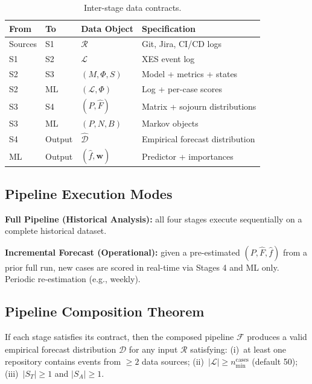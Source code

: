 \begin{table}[htbp]
\centering
\caption{Inter-stage data contracts.}
\label{tab:data-contracts}
\small
\begin{tabular}{lllp{5cm}}
\toprule
\textbf{From} & \textbf{To} & \textbf{Data Object} & \textbf{Specification} \\
\midrule
Sources & S1     & $\mathcal{R}$        & Git, Jira, CI/CD logs \\
S1      & S2     & $\mathcal{L}$        & XES event log \\
S2      & S3     & $(M, \Phi, S)$       & Model + metrics + states \\
S2      & ML     & $(\mathcal{L}, \Phi)$ & Log + per-case scores \\
S3      & S4     & $(P, \hat{F})$       & Matrix + sojourn distributions \\
S3      & ML     & $(P, N, B)$          & Markov objects \\
S4      & Output & $\hat{\mathcal{D}}$  & Empirical forecast distribution \\
ML      & Output & $(\hat{f}, \mathbf{w})$ & Predictor + importances \\
\bottomrule
\end{tabular}
\end{table}


\subsection{Pipeline Execution Modes}
\label{sec:execution-modes}

\textbf{Full Pipeline (Historical Analysis):} all four stages execute
sequentially on a complete historical dataset.

\textbf{Incremental Forecast (Operational):} given a pre-estimated
$(P, \hat{F}, \hat{f})$ from a prior full run, new cases are scored in
real-time via Stages 4 and ML only. Periodic re-estimation (e.g., weekly).


\subsection{Pipeline Composition Theorem}
\label{sec:composition}

\begin{theorem}
\label{thm:pipeline-correctness}
If each stage satisfies its contract, then the composed pipeline
$\mathcal{F}$ produces a valid empirical forecast distribution
$\hat{\mathcal{D}}$ for any input $\mathcal{R}$ satisfying:
(i)~at least one repository contains events from $\geq 2$ data sources;
(ii)~$|\mathcal{L}| \geq n_{\min}^{\text{cases}}$ (default 50);
(iii)~$|S_T| \geq 1$ and $|S_A| \geq 1$.
\end{theorem}

